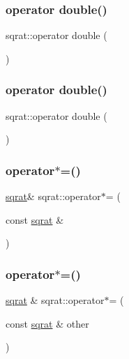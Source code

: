 \subsubsection{\texorpdfstring{operator double()}{operator double()}\hspace{0.1cm}{\footnotesize\ttfamily [2/3]}}
{\footnotesize\ttfamily sqrat\+::operator double (\begin{DoxyParamCaption}{ }\end{DoxyParamCaption})\hspace{0.3cm}{\ttfamily [explicit]}}

\mbox{\label{classsqrat_af1d90ee59e36a87aa7a94dacdab875de}} 
\subsubsection{\texorpdfstring{operator double()}{operator double()}\hspace{0.1cm}{\footnotesize\ttfamily [3/3]}}
{\footnotesize\ttfamily sqrat\+::operator double (\begin{DoxyParamCaption}{ }\end{DoxyParamCaption})\hspace{0.3cm}{\ttfamily [explicit]}}

\mbox{\label{classsqrat_aae14e57b87f37f2073e809efd51fbe8e}} 
\subsubsection{\texorpdfstring{operator$\ast$=()}{operator*=()}\hspace{0.1cm}{\footnotesize\ttfamily [1/3]}}
{\footnotesize\ttfamily \mbox{\hyperlink{classsqrat}{sqrat}}\& sqrat\+::operator$\ast$= (\begin{DoxyParamCaption}\item[{const \mbox{\hyperlink{classsqrat}{sqrat}} \&}]{ }\end{DoxyParamCaption})}

\mbox{\label{classsqrat_a6be4d90a04d40dcdbbb0021e63893718}} 
\subsubsection{\texorpdfstring{operator$\ast$=()}{operator*=()}\hspace{0.1cm}{\footnotesize\ttfamily [2/3]}}
{\footnotesize\ttfamily \mbox{\hyperlink{classsqrat}{sqrat}} \& sqrat\+::operator$\ast$= (\begin{DoxyParamCaption}\item[{const \mbox{\hyperlink{classsqrat}{sqrat}} \&}]{other }\end{DoxyParamCaption})}

